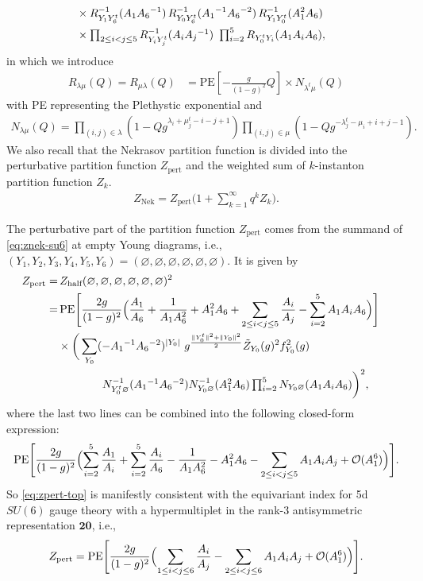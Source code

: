 \documentclass[letterpaper, 11pt]{article}
\begin{document}
{\begin{align}
\cr 
& 
\times 
R_{Y_1 Y_6^t}^{-1} (A_1 A_6{}^{-1})\,R_{Y_0 Y_6^t}^{-1} (A_1{}^{-1} A_6{}^{-2})\,R_{Y_1Y_0^t }^{-1} (A_1^2A_6) \cr 
& 
\times  
 \textstyle\prod_{2 \le i <  j \le 5} R_{Y_i Y_j^t}^{-1} (A_i A_j{}^{-1})\ 
 \prod_{i=2}^5 R_{Y_0^t Y_i} (A_1 A_i  A_6) ,
\end{align}
in which we introduce
\begin{align}
R_{\lambda \mu} (Q)=R_{ \mu\lambda} (Q)
&= \text{PE} \left[ - \frac{g}{(1-g)^2} Q \right]
\times N_{\lambda^t \mu} (Q)
\end{align}
with PE representing the Plethystic exponential
 and 
\begin{align}
N_{\lambda \mu} (Q) 
= \prod_{(i,j) \in \lambda} \left( 1 - Q g^{\lambda_i + \mu_j^t -i-j+1} \right)
\prod_{(i,j) \in \mu} \left( 1 - Q g^{-\lambda^t_j - \mu_i + i + j - 1} \right).
\end{align}
We also recall that the Nekrasov partition function is divided into the perturbative partition function $Z_{\text{pert}}$ and the weighted sum of $k$-instanton partition function $Z_k$.
\begin{align}
Z_{\text{Nek}} = Z_{\text{pert}}\Big(1 + \sum_{k=1}^{\infty}q^kZ_k\Big).
\end{align}

The perturbative part of the partition function $Z_{\text{pert}}$ comes from the summand of \eqref{eq:znek-su6} at empty Young diagrams, i.e., $(Y_1, Y_2, Y_3, Y_4, Y_5, Y_6) = (\varnothing,\varnothing,\varnothing,\varnothing,\varnothing,\varnothing)$. It is given by
\begin{align}
  \label{eq:zpert-top}
Z_{\rm pert} 
=& \,
Z_{\text{half}}(\varnothing,\varnothing,\varnothing,\varnothing,\varnothing,\varnothing)^2
\cr
=&\, 
\text{PE} \Biggl[ 
\frac{2g}{(1-g)^2} 
\Bigl( \frac{A_1}{A_6} + \frac{1}{A_1A_6^2} + A_1^2  A_6 
+ \sum_{2 \le i <  j \le 5} \frac{A_i}{A_j}
- \sum_{i=2}^5 A_1 A_i  A_6
\Bigr)
\Biggr]
\cr 
& 
\times \bigg(\sum_{Y_0} ( - A_1{}^{-1} A_6{}^{-2})^{|Y_0|} \ 
g^{\frac{\Vert Y_0^t \Vert ^2+\Vert Y_0\Vert ^2}{2}} \tilde{Z}_{Y_0}(g)^2 f_{Y_0}^2(g)
\cr 
& \qquad \qquad
\textstyle N_{Y_0^t \varnothing }^{-1} (A_1{}^{-1} A_6{}^{-2})
 N^{-1}_{Y_0 \varnothing } (A_1^2  A_6)\prod_{i=2}^5 N_{Y_0 \varnothing } (A_1 A_i  A_6)\bigg)^2 ,
\end{align}
where the last two lines can be  combined into the following closed-form expression:
\begin{align}
  \text{PE} \Biggl[ 
    \frac{2g}{(1-g)^2} 
    \Bigl(\sum_{i=2}^5  \frac{A_1}{A_i} +\sum_{i=2}^5  \frac{A_i}{A_6} - \frac{1}{A_1A_6^2} - A_1^2  A_6 
    - \sum_{2\leq i<j \leq 5} A_1 A_i  A_j + \mathcal{O}(A_1^6)
    \Bigr)
    \Biggr].
\end{align}
So \eqref{eq:zpert-top} is manifestly consistent with the equivariant index  \cite{Shadchin:2005mx} for 5d $SU(6)$ gauge theory with a hypermultiplet in the rank-3 antisymmetric representation $\mathbf{20}$, i.e., 
\begin{align}
  Z_{\rm pert}  = \text{PE} \Biggl[ 
    \frac{2g}{(1-g)^2} 
    \Bigl(\sum_{1\leq i<j \leq 6}  \frac{A_i}{A_j} 
    - \sum_{2\leq i<j \leq 6} A_1 A_i  A_j + \mathcal{O}(A_1^6)
    \Bigr)
    \Biggr].
\end{align}

}
\end{document}
